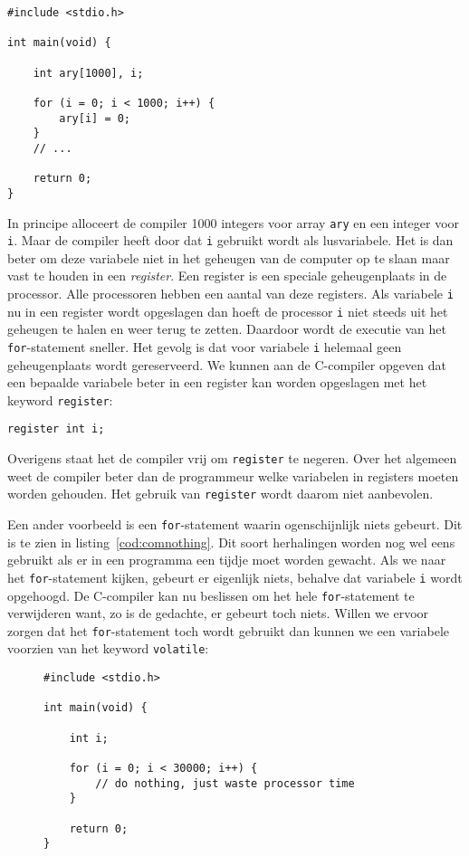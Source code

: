 \begin{lstlisting}[caption=Een C-programma.,label=cod:comclearary]
#include <stdio.h>

int main(void) {

    int ary[1000], i;
    
    for (i = 0; i < 1000; i++) {
        ary[i] = 0;
    }
    // ...
    
    return 0;
}
\end{lstlisting}

In principe alloceert de compiler 1000 integers voor array \texttt{ary} en een integer voor \texttt{i}. Maar de compiler heeft door dat \texttt{i} gebruikt wordt als lusvariabele. Het is dan beter om deze variabele niet in het geheugen van de computer op te slaan maar vast te houden in een \textsl{register}. Een register is een speciale geheugenplaats in de processor. Alle processoren hebben een aantal van deze registers. Als variabele \texttt{i} nu in een register wordt opgeslagen dan hoeft de processor \texttt{i} niet steeds uit het geheugen te halen en weer terug te zetten. Daardoor wordt de executie van het \texttt{for}-statement sneller. Het gevolg is dat voor variabele \texttt{i} helemaal geen geheugenplaats wordt gereserveerd. We kunnen aan de C-compiler opgeven dat een bepaalde variabele beter in een register kan worden opgeslagen met het keyword \texttt{register}:

\hspace*{1em}\texttt{register int i;}

Overigens staat het de compiler vrij om \texttt{register} te negeren. Over het algemeen weet de compiler beter dan de programmeur welke variabelen in registers moeten worden gehouden. Het gebruik van \texttt{register} wordt daarom niet aanbevolen.

Een ander voorbeeld is een \texttt{for}-statement waarin ogenschijnlijk niets gebeurt. Dit is te zien in listing~\ref{cod:comnothing}.
Dit soort herhalingen worden nog wel eens gebruikt als er in een programma een tijdje moet worden gewacht. Als we naar het \texttt{for}-statement kijken, gebeurt er eigenlijk niets, behalve dat variabele \texttt{i} wordt opgehoogd. De C-compiler kan nu beslissen om het hele \texttt{for}-statement te verwijderen want, zo is de gedachte, er gebeurt toch niets. Willen we ervoor zorgen dat het \texttt{for}-statement toch wordt gebruikt dan kunnen we een variabele voorzien van het keyword \texttt{volatile}:

\begin{figure}[!ht]
\begin{lstlisting}[caption=Een C-programma.,label=cod:comnothing]
#include <stdio.h>

int main(void) {

    int i;
    
    for (i = 0; i < 30000; i++) {
        // do nothing, just waste processor time
    }
    
    return 0;
}
\end{lstlisting}
\end{figure}

